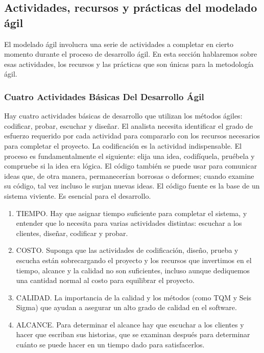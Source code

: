 \subsection{Actividades, recursos y prácticas del modelado ágil }
El modelado ágil involucra una serie de actividades a completar en cierto momento durante el proceso de desarrollo ágil. En esta sección hablaremos sobre esas actividades, los recursos y las prácticas que son únicas para la metodología ágil. 

\subsubsection{Cuatro Actividades Básicas Del Desarrollo Ágil }
Hay cuatro actividades básicas de desarrollo que utilizan los métodos ágiles: codificar, probar, escuchar y diseñar. El analista necesita identificar el grado de esfuerzo requerido por cada actividad para compararlo con los recursos necesarios para completar el proyecto. La codificación es la actividad indispensable. El proceso es fundamentalmente el siguiente: elija una idea, codifíquela, pruébela y compruebe si la idea era lógica. El código también se puede usar para comunicar ideas que, de otra manera, permanecerían borrosas o deformes; cuando examine su código, tal vez incluso le surjan nuevas ideas. El código fuente es la base de un sistema viviente. Es esencial para el desarrollo.
\begin{enumerate}
\item TIEMPO.    Hay que asignar tiempo suficiente para completar el sistema, y entender que lo necesita para varias actividades distintas: escuchar a los clientes, diseñar, codificar y probar. 
\item COSTO.    Suponga que las actividades de codificación, diseño, prueba y escucha están sobrecargando el proyecto y los recursos que invertimos en el tiempo, alcance y la calidad no son suficientes, incluso aunque dediquemos una cantidad normal al costo para equilibrar el proyecto. 
\item CALIDAD.  La importancia de la calidad y los métodos (como TQM y Seis Sigma) que ayudan a asegurar un alto grado de calidad en el software.
\item ALCANCE.  Para determinar el alcance hay que escuchar a los clientes y hacer que escriban sus historias, que se examinan después para determinar cuánto se puede hacer en un tiempo dado para satisfacerlos.
\end{enumerate}

